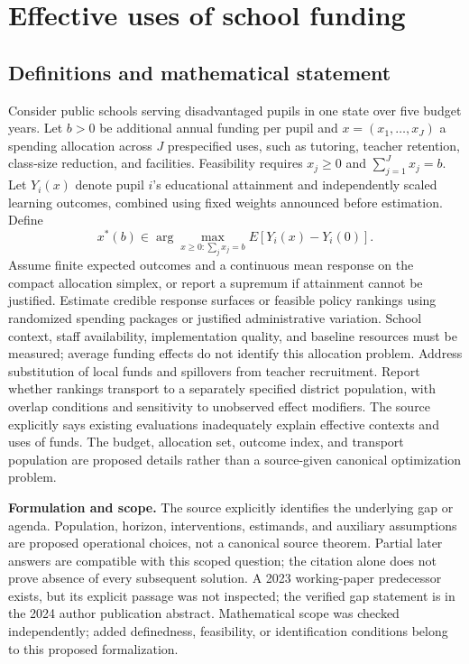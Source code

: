 \documentclass[11pt]{article}
\begin{document}
\section*{Effective uses of school funding}\label{30007734}
\subsection{Definitions and mathematical statement}
Consider public schools serving disadvantaged pupils in one state over five budget years. Let \(b>0\) be additional annual funding per pupil and \(x=(x_1,\ldots,x_J)\) a spending allocation across \(J\) prespecified uses, such as tutoring, teacher retention, class-size reduction, and facilities. Feasibility requires \(x_j\geq0\) and \(\sum_{j=1}^{J}x_j=b\). Let \(Y_i(x)\) denote pupil \(i\)'s educational attainment and independently scaled learning outcomes, combined using fixed weights announced before estimation. Define
\[x^*(b)\in\arg\max_{x\geq0:\sum_jx_j=b}E[Y_i(x)-Y_i(0)].\]
Assume finite expected outcomes and a continuous mean response on the compact allocation simplex, or report a supremum if attainment cannot be justified. Estimate credible response surfaces or feasible policy rankings using randomized spending packages or justified administrative variation. School context, staff availability, implementation quality, and baseline resources must be measured; average funding effects do not identify this allocation problem. Address substitution of local funds and spillovers from teacher recruitment. Report whether rankings transport to a separately specified district population, with overlap conditions and sensitivity to unobserved effect modifiers. The source explicitly says existing evaluations inadequately explain effective contexts and uses of funds. The budget, allocation set, outcome index, and transport population are proposed details rather than a source-given canonical optimization problem.

\par\textbf{Formulation and scope.} The source explicitly identifies the underlying gap or agenda. Population, horizon, interventions, estimands, and auxiliary assumptions are proposed operational choices, not a canonical source theorem. Partial later answers are compatible with this scoped question; the citation alone does not prove absence of every subsequent solution. A 2023 working-paper predecessor exists, but its explicit passage was not inspected; the verified gap statement is in the 2024 author publication abstract. Mathematical scope was checked independently; added definedness, feasibility, or identification conditions belong to this proposed formalization.
\end{document}
